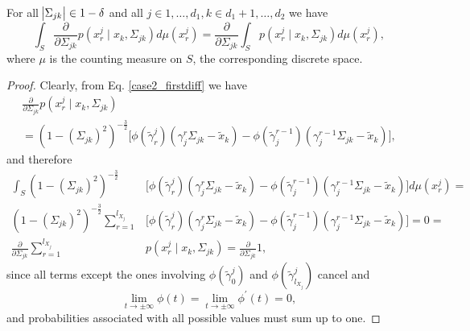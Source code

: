 \begin{lemma}\label{interchange_caseII_firstdif}
    For all $\abs{\Sigma_{jk}} \in 1-\delta$ and all $j \in 1, \dots, d_1, k\in d_1 +1, \dots, d_2$ we have
    \begin{equation*}
        \int_S \frac{\partial }{\partial \Sigma_{jk}} p(x^j_{r} \mid x_{k}, \Sigma_{jk}) d\mu(x_r^j)= \frac{\partial }{\partial \Sigma_{jk}} \int_S p(x^j_{r} \mid x_{k}, \Sigma_{jk}) d\mu(x_r^j),
    \end{equation*}
    where $\mu$ is the counting measure on $S$, the corresponding discrete space.
    
    \begin{proof}
        Clearly, from Eq. \eqref{case2_firstdiff} we have 
        \begin{multline*}
            \frac{\partial }{\partial \Sigma_{jk}} p(x^j_{r} \mid x_{k}, \Sigma_{jk}) \\
            =  (1-(\Sigma_{jk})^2)^{-\frac{3}{2}}\Big[\phi({\tilde{\gamma}}^j_{r})({\gamma}_j^r\Sigma_{jk} - {\tilde{x}}_{k}) - \phi({\tilde{\gamma}}_j^{r-1})({\gamma}_j^{r-1}\Sigma_{jk} - {\tilde{x}}_{k})\Big],
        \end{multline*}
        and therefore 
        \begin{equation*}
            \begin{split}
                \int_S (1-(\Sigma_{jk})^2)^{-\frac{3}{2}}&\Big[\phi({\tilde{\gamma}}^j_{r})({\gamma}_j^r\Sigma_{jk} - {\tilde{x}}_{k}) - \phi({\tilde{\gamma}}_j^{r-1})({\gamma}_j^{r-1}\Sigma_{jk} - {\tilde{x}}_{k})\Big] d\mu(x_r^j) = \\
                (1-(\Sigma_{jk})^2)^{-\frac{3}{2}} \sum_{r=1}^{l_{X_j}} &\Big[\phi({\tilde{\gamma}}^j_{r})({\gamma}_j^r\Sigma_{jk} - {\tilde{x}}_{k}) - \phi({\tilde{\gamma}}_j^{r-1})({\gamma}_j^{r-1}\Sigma_{jk} - {\tilde{x}}_{k})\Big] = 0 = \\
                \frac{\partial }{\partial \Sigma_{jk}} \sum_{r=1}^{l_{X_j}} &p(x^j_{r} \mid x_{k}, \Sigma_{jk}) = \frac{\partial }{\partial \Sigma_{jk}} 1,
            \end{split}
        \end{equation*}
        since all terms except the ones involving $\phi({\tilde{\gamma}}^j_{0})$ and $\phi({\tilde{\gamma}}^j_{l_{X_j}})$ cancel and 
        \begin{equation*}
            \lim\limits_{t \to \pm \infty} \phi(t) = \lim\limits_{t \to \pm \infty} \phi^\prime(t) = 0,
        \end{equation*} 
        and probabilities associated with all possible values must sum up to one. 
    \end{proof}
\end{lemma}

